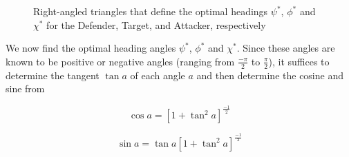 \begin{figure}[ht!]
	\centering
	\newcommand{\pythagwidth}{3cm}
	\newcommand{\pythagheight}{2cm}
\caption{Right-angled triangles that define the optimal headings $\psi^*$, $\phi^*$ and $\chi^*$ for the Defender, Target, and Attacker, respectively}
\label{optimal heading angles}
\end{figure}


We now find the optimal heading angles $\psi^*$, $\phi^*$ and $\chi^*$. Since these angles are known to be positive or negative angles (ranging from $\frac{-\pi}{2}$ to $\frac{\pi}{2}$), it suffices to determine the tangent $\tan a$ of each angle $a$ and then determine the cosine and sine from

\begin{equation}
	\cos a = [1+ \tan^2 a ]^{\frac{-1}{2}}
	\label{cos a}
\end{equation}

\begin{equation}
\sin a =\tan a [1+ \tan^2 a ]^{\frac{-1}{2}}
\label{sin a}
\end{equation}

